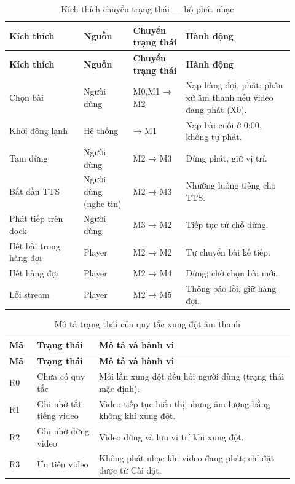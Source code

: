 \begin{longtable}{>{\RaggedRight\arraybackslash}p{0.24\linewidth}>{\RaggedRight\arraybackslash}p{0.16\linewidth}>{\RaggedRight\arraybackslash}p{0.17\linewidth}>{\RaggedRight\arraybackslash}p{0.35\linewidth}}
\caption{Kích thích chuyển trạng thái — bộ phát nhạc}
\label{tab:state-music-stim}\\
\toprule
\textbf{Kích thích} & \textbf{Nguồn} & \textbf{Chuyển trạng thái} & \textbf{Hành động} \\
\midrule
\endfirsthead
\toprule
\textbf{Kích thích} & \textbf{Nguồn} & \textbf{Chuyển trạng thái} & \textbf{Hành động} \\
\midrule
\endhead
\bottomrule
\endfoot
Chọn bài & Người dùng & M0,M1 → M2 & Nạp hàng đợi, phát; phân xử âm thanh nếu video đang phát (X0). \\
Khởi động lạnh & Hệ thống & → M1 & Nạp bài cuối ở 0:00, không tự phát. \\
Tạm dừng & Người dùng & M2 → M3 & Dừng phát, giữ vị trí. \\
Bắt đầu TTS & Người dùng (nghe tin) & M2 → M3 & Nhường luồng tiếng cho TTS. \\
Phát tiếp trên dock & Người dùng & M3 → M2 & Tiếp tục từ chỗ dừng. \\
Hết bài trong hàng đợi & Player & M2 → M2 & Tự chuyển bài kế tiếp. \\
Hết hàng đợi & Player & M2 → M4 & Dừng; chờ chọn bài mới. \\
Lỗi stream & Player & M2 → M5 & Thông báo lỗi, giữ hàng đợi. \\
\end{longtable}
\endgroup

\begingroup\small\renewcommand{\arraystretch}{1.12}\setlength{\tabcolsep}{3pt}
\begin{longtable}{>{\RaggedRight\arraybackslash}p{0.09\linewidth}>{\RaggedRight\arraybackslash}p{0.20\linewidth}>{\RaggedRight\arraybackslash}p{0.63\linewidth}}
\caption{Mô tả trạng thái của quy tắc xung đột âm thanh}
\label{tab:state-rule}\\
\toprule
\textbf{Mã} & \textbf{Trạng thái} & \textbf{Mô tả và hành vi} \\
\midrule
\endfirsthead
\toprule
\textbf{Mã} & \textbf{Trạng thái} & \textbf{Mô tả và hành vi} \\
\midrule
\endhead
\bottomrule
\endfoot
R0 & Chưa có quy tắc & Mỗi lần xung đột đều hỏi người dùng (trạng thái mặc định). \\
R1 & Ghi nhớ tắt tiếng video & Video tiếp tục hiển thị nhưng âm lượng bằng không khi xung đột. \\
R2 & Ghi nhớ dừng video & Video dừng và lưu vị trí khi xung đột. \\
R3 & Ưu tiên video & Không phát nhạc khi video đang phát; chỉ đặt được từ Cài đặt. \\
\end{longtable}

